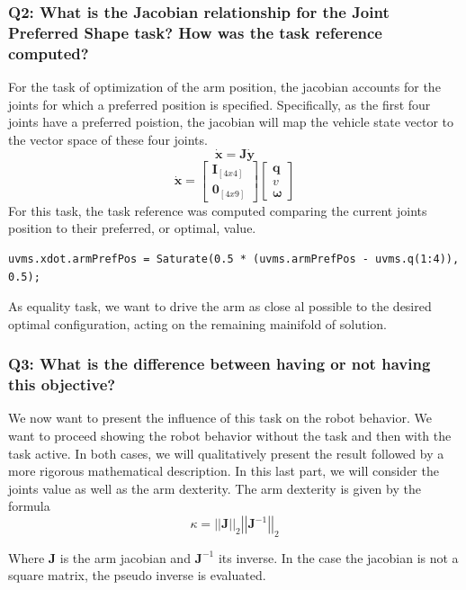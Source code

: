\documentclass{article}
\begin{document}
\subsubsection{Q2: What is the Jacobian relationship for the Joint Preferred Shape task? How was the task reference computed?}
For the task of optimization of the arm position, the jacobian accounts for the joints for which a preferred position is specified. Specifically, as the first four joints have a preferred poistion, the jacobian will map the vehicle state vector to the vector space of these four joints. 
$$
	\bm{\dot{x}} = \bm{J}\bm{\dot{y}}
$$ $$	
	\bm{\dot{x}} = \begin{bmatrix} \bm{I}_{[4x4]} \\ \bm{0}_{[4x9]} \end{bmatrix}         
	\begin{bmatrix} \bm{q}    \\ \bm{\textit{v}} \\ \bm{\omega} \end{bmatrix} 	   
$$
For this task, the task reference was computed comparing the current joints position to their preferred, or optimal, value. 
\begin{lstlisting}
uvms.xdot.armPrefPos = Saturate(0.5 * (uvms.armPrefPos - uvms.q(1:4)), 0.5);
\end{lstlisting}

As equality task, we want to drive the arm as close al possible to the desired optimal configuration, acting on the remaining mainifold of solution. 

\subsubsection{Q3: What is the difference between having or not having this objective?}

We now want to present the influence of this task on the robot behavior. We want to proceed showing the robot behavior without the task and then with the task active. In both cases, we will qualitatively present the result followed by a more rigorous mathematical description. In this last part, we will consider the joints value as well as the arm dexterity. The arm dexterity is given by the formula
$$ \kappa = \left|\left| \bm{J} \right|\right|_2 \left|\left| \bm{J}^{-1} \right|\right|_2
$$

Where $\bm{J}$ is the arm jacobian and $\bm{J}^{-1}$ its inverse. In the case the jacobian is not a square matrix, the pseudo inverse is evaluated. 
\end{document}
